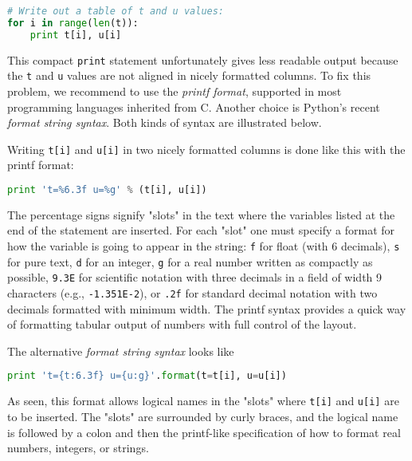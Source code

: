 \documentclass[graybox,sectrefs,envcountresetchap,open=right,final]{svmonodo}
\begin{document}
\begin{lstlisting}[language=python,style=blue1_bluegreen]
# Write out a table of t and u values:
for i in range(len(t)):
    print t[i], u[i]

\end{lstlisting}

This compact \texttt{print} statement unfortunately gives less readable output
because the \texttt{t} and \texttt{u} values are not aligned in nicely formatted columns.
To fix this problem, we recommend to use the \emph{printf format}, supported in most
programming languages inherited from C. Another choice is
Python's recent \emph{format string syntax}. Both kinds of syntax are illustrated
below.


Writing \texttt{t[i]} and \texttt{u[i]} in two nicely formatted columns is done like
this with the printf format:



\begin{lstlisting}[language=python,style=blue1_bluegreen]
print 't=%6.3f u=%g' % (t[i], u[i])

\end{lstlisting}

The percentage signs signify "slots" in the text where the variables
listed at the end of the statement are inserted. For each "slot" one
must specify a format for how the variable is going to appear in the
string: \texttt{f} for float (with 6 decimals),
\texttt{s} for pure text, \texttt{d} for an integer, \texttt{g} for a real number
written as compactly as possible, \texttt{9.3E} for scientific notation with
three decimals in a field of width 9 characters (e.g., \texttt{-1.351E-2}),
or \texttt{.2f} for standard decimal notation with two decimals
formatted with minimum width. The printf syntax provides a quick way
of formatting tabular output of numbers with full control of the
layout.


The alternative \emph{format string syntax} looks like


\begin{lstlisting}[language=python,style=blue1_bluegreen]
print 't={t:6.3f} u={u:g}'.format(t=t[i], u=u[i])

\end{lstlisting}

As seen, this format allows logical names in the "slots" where
\texttt{t[i]} and \texttt{u[i]} are to be inserted. The "slots" are surrounded
by curly braces, and the logical name is followed by a colon and
then the printf-like specification of how to format real numbers,
integers, or strings.
\end{document}
